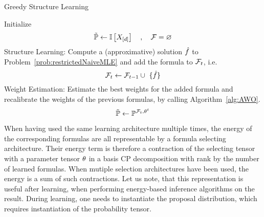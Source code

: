 \begin{algorithm}[hbt!]
\caption{Greedy Structure Learning}\label{alg:greedyStructureLearning}
\begin{algorithmic}
	\State Initialize
		\[ \tilde{\mathbb{P}} \leftarrow \mathbb{I}\left[X_{[d]}\right] \quad, \quad \mathcal{F} = \varnothing \]
		\State Structure Learning: Compute a (approximative) solution $\hat{f}$ to Problem~\ref{prob:restrictedNaiveMLE} and add the formula to $\mathcal{F}_{t}$, i.e.
				\[ \formulasetof{t} \leftarrow \formulasetof{t-1} \cup \{\hat{\formula}\} \]
		\State Weight Estimation: Estimate the best weights for the added formula and recalibrate the weights of the previous formulas, by calling Algorithm~\ref{alg:AWO}.
			\[ \tilde{\mathbb{P}} \leftarrow \mathbb{P}^{\mathcal{F}_{t}, \theta^{t}} \]
\EndWhile
\end{algorithmic}
\end{algorithm}



When having used the same learning architecture multiple times, the energy of the corresponding formulas are all representable by a formula selecting architecture.
Their energy term is therefore a contraction of the selecting tensor with a parameter tensor $\theta$ in a basis CP decomposition with rank by the number of learned formulas.
When mutiple selection architectures have been used, the energy is a sum of such contractions.
% 
Let us note, that this representation is useful after learning, when performing energy-based inference algorithms on the result.
During learning, one needs to instantiate the proposal distribution, which requires instantiation of the probability tensor.






